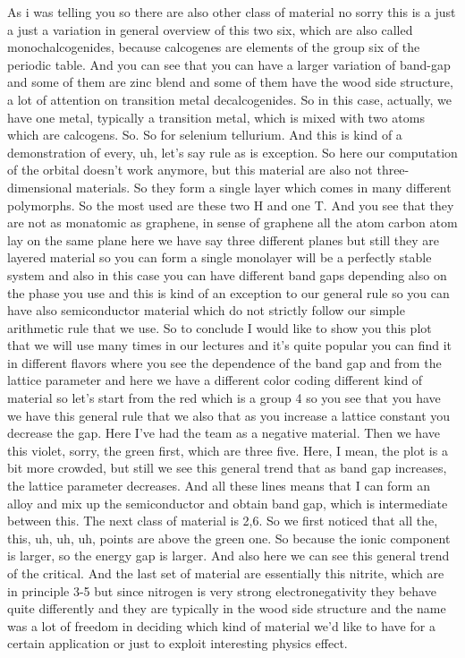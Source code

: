 As i was telling you so there are also other class of material no sorry this is a just a just a variation in general overview of this two six, which are also called monochalcogenides, because calcogenes are elements of the group six of the periodic table. And you can see that you can have a larger variation of band-gap and some of them are zinc blend and some of them have the wood side structure, a lot of attention on transition metal decalcogenides. So in this case, actually, we have one metal, typically a transition metal, which is mixed with two atoms which are calcogens. So. So for selenium tellurium. And this is kind of a demonstration of every, uh, let's say rule as is exception. So here our computation of the orbital doesn't work anymore, but this material are also not three-dimensional materials. So they form a single layer which comes in many different polymorphs. So the most used are these two H and one T. And you see that they are not as monatomic as graphene, in sense of graphene all the atom carbon atom lay on the same plane here we have say three different planes but still they are layered material so you can form a single monolayer will be a perfectly stable system and also in this case you can have different band gaps depending also on the phase you use and this is kind of an exception to our general rule so you can have also semiconductor material which do not strictly follow our simple arithmetic rule that we use.
So to conclude I would like to show you this plot that we will use many times in our lectures and it's quite popular you can find it in different flavors where you see the dependence of the band gap and from the lattice parameter and here we have a different color coding different kind of material so let's start from the red which is a group 4 so you see that you have we have this general rule that we also that as you increase a lattice constant you decrease the gap. Here I've had the team as a negative material. Then we have this violet, sorry, the green first, which are three five. Here, I mean, the plot is a bit more crowded, but still we see this general trend that as band gap increases, the lattice parameter decreases. And all these lines means that I can form an alloy and mix up the semiconductor and obtain band gap, which is intermediate between this. The next class of material is 2,6. So we first noticed that all the, this, uh, uh, uh, points are above the green one. So because the ionic component is larger, so the energy gap is larger. And also here we can see this general trend of the critical. And the last set of material are essentially this nitrite, which are in principle 3-5 but since nitrogen is very strong electronegativity they behave quite differently and they are typically in the wood side structure and the name was a lot of freedom in deciding which kind of material we'd like to have for a certain application or just to exploit interesting physics effect.\\
